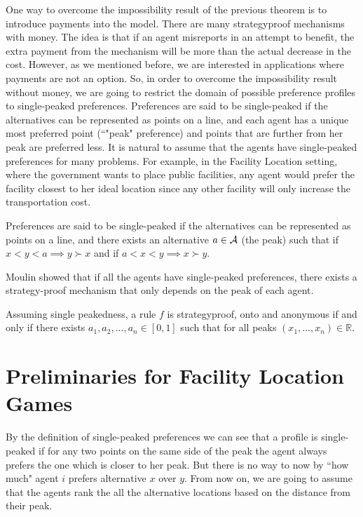 One way to overcome the impossibility result of the previous theorem is to introduce payments into the model. There are many strategyproof mechanisms with money. The idea is that if an agent misreports in an attempt to benefit, the extra payment from the mechanism will be more than the actual decrease in the cost. However, as we mentioned before, we are interested in applications where payments are not an option. So, in order to overcome the impossibility result without money, we are going to restrict the domain of possible preference profiles to single-peaked preferences. Preferences are said to be single-peaked if the alternatives can be represented as points on a line, and each agent has a unique most preferred point (``"peak" preference) and points that are further from her peak are preferred less. It is natural to assume that the agents have single-peaked preferences for many problems. For example, in the Facility Location setting, where the government wants to place public facilities, any agent would prefer the facility closest to her ideal location since any other facility will only increase the transportation cost.


\begin{definition}
Preferences are said to be single-peaked if the alternatives can be represented as points on a line, and there exists an alternative $a \in \mathcal{A}$ (the peak) such that if $x<y<a \implies y \succ x$ and if  $a<x<y \implies x\succ y$. 
\end{definition}

Moulin \cite{Moulin1980} showed that if all the agents have single-peaked preferences, there exists a strategy-proof mechanism that only depends on the peak of each agent.


\begin{theorem}
Assuming single peakedness, a rule $f$ is strategyproof, onto and anonymous if and only if there exists $a_1,a_2,...,a_n\in [0,1]$ such that for all peaks $(x_1,...,x_n)\in \mathbb{R}$.
\end{theorem}




\section{Preliminaries for Facility Location Games}

By the definition of single-peaked preferences we can see that a profile is single-peaked if for any two points on the same side of the peak the agent always prefers the one which is closer to her peak. But there is no way to now by ``how much" agent $i$ prefers alternative $x$ over $y$. From now on, we are going to assume that the agents rank the all the alternative locations based on the distance from their peak.



